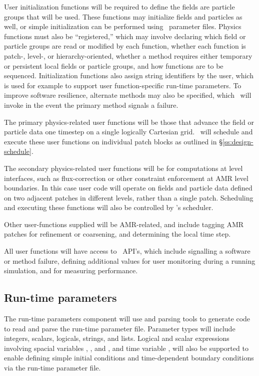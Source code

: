 \documentclass[10pt]{article}
\begin{document}
User initialization functions will be required to define the fields
are particle groups that will be used.  These functions may initialize
fields and particles as well, or simple initialization can be
performed using \cello\ parameter files.  Physics functions must also
be ``registered,'' which may involve declaring which field or particle
groups are read or modified by each function, whether each function is
patch-, level-, or hierarchy-oriented, whether a method requires
either temporary or persistent local fields or particle groups, and
how functions are to be sequenced.  Initialization functions also
assign string identifiers by the user, which is used for example to
support user function-specific run-time parameters.  To improve
software resilience, alternate methods may also be specified, which
\cello\ will invoke in the event the primary method signals a failure.

The primary physics-related user functions will be those that advance
the field or particle data one timestep on a single logically
Cartesian grid.  \cello\ will schedule and execute these user
functions on individual patch blocks as outlined in
\S\ref{ss:design-schedule}.  

The secondary physics-related user functions will be for computations
at level interfaces, such as flux-correction or other constraint
enforcement at AMR level boundaries.  In this case user code will
operate on fields and particle data defined on two adjacent patches in
different levels, rather than a single patch.  Scheduling and
executing these functions will also be controlled by \cello's scheduler.

Other user-functions supplied will be AMR-related, and include tagging
AMR patches for refinement or coarsening, and determining the local
time step.

All user functions will have access to \cello\ API's, which include
signalling a software or method failure, defining additional
values for user monitoring during a running simulation, and for
measuring performance.

\subsection{Run-time parameters} \label{ss:design-parameters}

The run-time parameters component will use  and
 parsing tools to generate code to read and parse the
run-time parameter file.  Parameter types will include integers,
scalars, logicals, strings, and lists.  Logical and scalar expressions
involving spacial variables , , and , and time
variable , will also be supported to enable defining simple
initial conditions and time-dependent boundary conditions via the
run-time parameter file.
\end{document}

